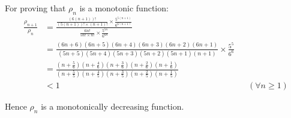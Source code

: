 \documentclass{article}
\begin{document}
For proving that $\rho_n$ is a monotonic function: \\
\begin{align*}
	\frac{\rho_{n+1}}{\rho_n} &= \frac{\frac{(6(n+1))!}{(5(n+1))! \times (n+1)!} \times \frac{5^{5(n+1)}}{6^{6(n+1)}}}{\frac{6n!}{5n! \times n!} \times \frac{5^{5n}}{6^{6n}}} \\
	&= \frac{(6n+6)(6n+5)(6n+4)(6n+3)(6n+2)(6n+1)}{(5n+5)(5n+4)(5n+3)(5n+2)(5n+1)(n+1)} \times \frac{5^5}{6^6} \\
	&= \frac{(n+\frac{5}{6})(n+\frac{4}{6})(n+\frac{3}{6})(n+\frac{2}{6})(n+\frac{1}{6})}{(n+\frac{5}{5})(n+\frac{4}{5})(n+\frac{3}{5})(n+\frac{2}{5})(n+\frac{1}{5})} \\
	&< 1 &&(\forall n \geqslant 1)
\end{align*}

Hence $\rho_n$ is a monotonically decreasing function.
\end{document}
